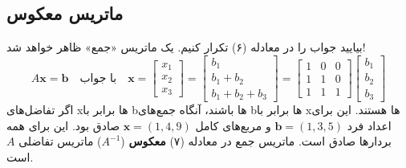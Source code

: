 \documentclass[12pt, a4paper]{book}
\begin{document}
	\subsection*{ماتریس معکوس}
	بیایید جواب  را در معادله (۶) تکرار کنیم. یک ماتریس «جمع» ظاهر خواهد شد!
	\begin{equation}
		A\mathbf{x} = \mathbf{b} \quad \text{با جواب} \quad \mathbf{x} = \begin{bmatrix} x_1 \\ x_2 \\ x_3 \end{bmatrix} = \begin{bmatrix} b_1 \\ b_1 + b_2 \\ b_1 + b_2 + b_3 \end{bmatrix} = \begin{bmatrix} 1 & 0 & 0 \\ 1 & 1 & 0 \\ 1 & 1 & 1 \end{bmatrix} \begin{bmatrix} b_1 \\ b_2 \\ b_3 \end{bmatrix}
	\end{equation}
	اگر تفاضل‌های xها برابر با bها باشند، آنگاه جمع‌های bها برابر با xها هستند. این برای اعداد فرد $\mathbf{b}=(1,3,5)$ و مربع‌های کامل $\mathbf{x}=(1,4,9)$ صادق بود. این برای همه بردارها صادق است.
	ماتریس جمع در معادله (۷) \textbf{معکوس} ($A^{-1}$) ماتریس تفاضلی $A$ است.
	
\end{document}
